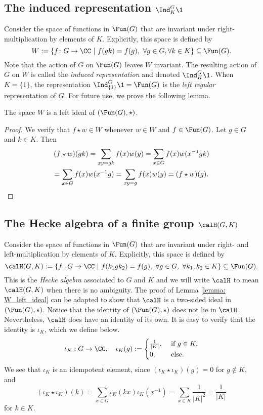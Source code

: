 \subsection{The induced representation $\Ind_K^G \1$}\label{Section1.2}
Consider the space of functions in $\Fun(G)$ that are invariant under right-multiplication by elements of $K$.
Explicitly, this space is defined by
\[
	W: = \{f\colon G\to \CC\ |\ f(gk) = f(g),\ \forall g\in G, \forall k \in K\} \subseteq \Fun(G).
\]
Note that the action of $G$ on $\Fun(G)$ leaves $W$ invariant.
The resulting action of $G$ on $W$ is called the \emph{induced representation} and denoted $\Ind_K^G \1$.
When $K=\{1\}$, the representation $\Ind_{\{1\}}^G\1=\Fun(G)$ is the \emph{left regular} representation of $G$.
For future use, we prove the following lemma.
\begin{lem}\label{lemma: W_left_ideal}
	The space $W$ is a left ideal of $(\Fun(G),\star)$.
\end{lem}
\begin{proof}
	We verify that $f\star w\in W$ whenever $w\in W$ and $f\in\Fun(G)$.
	Let $g\in G$ and $k\in K$.
	Then
	\begin{multline*}
		(f\star w)(gk) = \sum_{xy=gk} f(x)w(y) = \sum_{x\in G} f(x)w(x^{-1}gk) \\
		= \sum_{x\in G} f(x)w(x^{-1}g) = \sum_{xy=g} f(x)w(y) = (f\star w)(g).\qedhere
	\end{multline*}
\end{proof}


\subsection{The Hecke algebra of a finite group $\calH(G,K)$}\label{Section1.3}
Consider the space of functions in $\Fun(G)$ that are invariant under right- and left-multiplication by elements of $K$.
Explicitly, this space is defined by
\[
	\calH(G,K) := \{f\colon G\to \CC\ |\ f(k_1gk_2) = f(g),\ \forall g\in G,\ \forall k_1,k_2\in K\} \subseteq \Fun(G).
\]
This is the \emph{Hecke algebra} associated to $G$ and $K$ and we will write $\calH$ to mean $\calH(G,K)$ when there is no ambiguity.
The proof of Lemma \ref{lemma: W_left_ideal} can be adapted to show that $\calH$ is a two-sided ideal in $(\Fun(G),\star)$.
Notice that the identity of $(\Fun(G),\star)$ does not lie in $\calH$.
Nevertheless, $\calH$ does have an identity of its own.
It is easy to verify that the identity is $\iota_K$, which we define below.
\[
	\iota_K:G\to\CC,\quad \iota_K(g) := \begin{cases}
		\frac{1}{|K|},\  & \text{if}\ g\in K, \\
		0,\              & \text{else}.
	\end{cases}
\]
We see that $\iota_K$ is an idempotent element, since $(\iota_K\star\iota_K)(g)=0$ for $g\notin K$, and
\[
	(\iota_K\star\iota_K)(k) = \sum_{x\in G} \iota_K(kx)\iota_K(x^{-1}) = \sum_{x\in K} \frac{1}{|K|^2} = \frac{1}{|K|}
\]
for $k\in K$.

